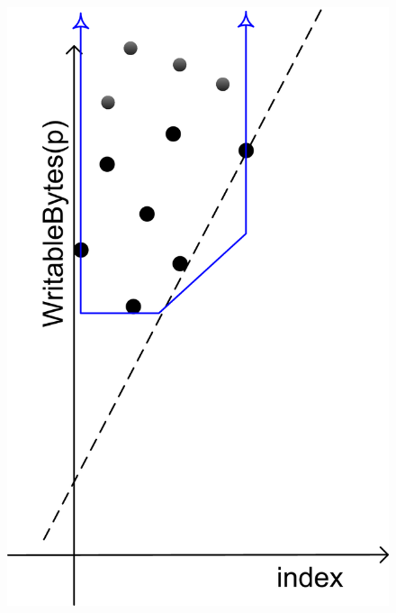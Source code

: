 \documentclass[10pt]{sigplanconf}
\begin{document}
\begin{figure}[t]
{   \includegraphics[scale=.57]{Octagons.png}
   \label{fig:octagons}
   }
\end{figure}
\end{document}
